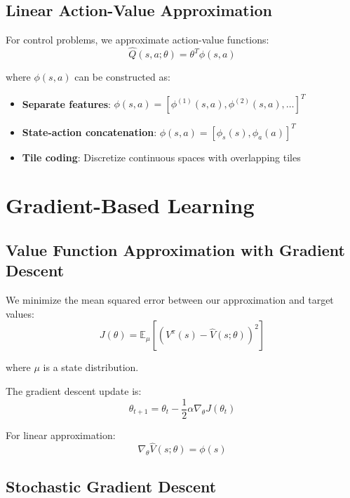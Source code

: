 \subsection{Linear Action-Value Approximation}

For control problems, we approximate action-value functions:
\begin{equation}
\hat{Q}(s,a; \theta) = \theta^T \phi(s,a)
\end{equation}

where $\phi(s,a)$ can be constructed as:
\begin{itemize}
\item \textbf{Separate features}: $\phi(s,a) = [\phi^{(1)}(s,a), \phi^{(2)}(s,a), \ldots]^T$
\item \textbf{State-action concatenation}: $\phi(s,a) = [\phi_s(s), \phi_a(a)]^T$
\item \textbf{Tile coding}: Discretize continuous spaces with overlapping tiles
\end{itemize}

\section{Gradient-Based Learning}

\subsection{Value Function Approximation with Gradient Descent}

We minimize the mean squared error between our approximation and target values:
\begin{equation}
J(\theta) = \mathbb{E}_{\mu} \left[ \left( V^\pi(s) - \hat{V}(s; \theta) \right)^2 \right]
\end{equation}

where $\mu$ is a state distribution.

The gradient descent update is:
\begin{equation}
\theta_{t+1} = \theta_t - \frac{1}{2} \alpha \nabla_\theta J(\theta_t)
\end{equation}

For linear approximation:
\begin{equation}
\nabla_\theta \hat{V}(s; \theta) = \phi(s)
\end{equation}

\subsection{Stochastic Gradient Descent}

